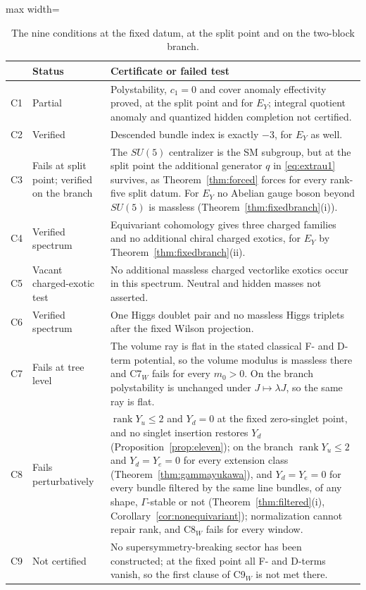 \begin{table}[t]
\caption{The nine conditions at the fixed datum, at the split point and on
the two-block branch.}\label{tab:ledger}
\small
\begin{adjustbox}{max width=\linewidth}\begin{tabular}{@{}p{.06\linewidth}>{\raggedright\arraybackslash}p{.18\linewidth}>{\raggedright\arraybackslash}p{.65\linewidth}@{}}
\toprule
&Status&Certificate or failed test\\\midrule
C1&Partial&Polystability, $c_1=0$ and cover anomaly effectivity proved,
at the split point and for $E_Y$; integral quotient anomaly and quantized
hidden completion not certified.\\
C2&Verified&Descended bundle index is exactly $-3$, for $E_Y$ as well.\\
C3&Fails at split point; verified on the branch&The $SU(5)$ centralizer is
the SM subgroup, but at the split point the additional generator $q$ in
\eqref{eq:extrau1} survives, as Theorem~\ref{thm:forced} forces for every
rank-five split datum. For $E_Y$ no Abelian gauge boson beyond $SU(5)$ is
massless (Theorem~\ref{thm:fixedbranch}(i)).\\
C4&Verified spectrum&Equivariant cohomology gives three charged families
and no additional chiral charged exotics, for $E_Y$ by
Theorem~\ref{thm:fixedbranch}(ii).\\
C5&Vacant charged-exotic test&No additional massless charged vectorlike
exotics occur in this spectrum. Neutral and hidden masses not asserted.\\
C6&Verified spectrum&One Higgs doublet pair and no massless Higgs triplets
after the fixed Wilson projection.\\
C7&Fails at tree level&The volume ray is flat in the stated classical
F- and D-term potential, so the volume modulus is massless there and
C7$_W$ fails for every $m_0>0$. On the branch polystability is unchanged
under $J\mapsto\lambda J$, so the same ray is flat.\\
C8&Fails perturbatively&$\operatorname{rank}Y_u\le2$ and $Y_d=0$ at the
fixed zero-singlet point, and no singlet insertion restores $Y_d$
(Proposition~\ref{prop:eleven}); on the branch $\operatorname{rank}Y_u\le2$
and $Y_d=Y_e=0$ for every extension class (Theorem~\ref{thm:gammayukawa}),
and $Y_d=Y_e=0$ for every bundle filtered by the same line bundles, of any
shape, $\Gamma$-stable or not (Theorem~\ref{thm:filtered}(i),
Corollary~\ref{cor:nonequivariant});
normalization cannot repair rank, and C8$_W$ fails for every window.\\
C9&Not certified&No supersymmetry-breaking sector has been constructed;
at the fixed point all F- and D-terms vanish, so the first clause of
C9$_W$ is not met there.\\\bottomrule
\end{tabular}\end{adjustbox}
\end{table}
